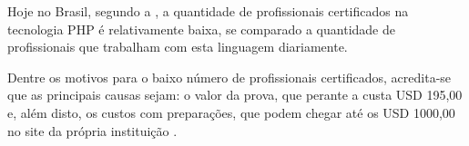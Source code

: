 Hoje no Brasil, segundo a , a 
quantidade de profissionais certificados na tecnologia PHP é relativamente 
baixa, se comparado a quantidade de profissionais que trabalham com esta 
linguagem diariamente.

Dentre os motivos para o baixo número de profissionais certificados, acredita-se
que as principais causas sejam: o valor da prova, que perante a 
 custa USD 195,00 e, além disto,  os
custos com preparações, que podem chegar até os USD 1000,00 no site da  própria
instituição \cite{websiteZendOnlineTraining}.
